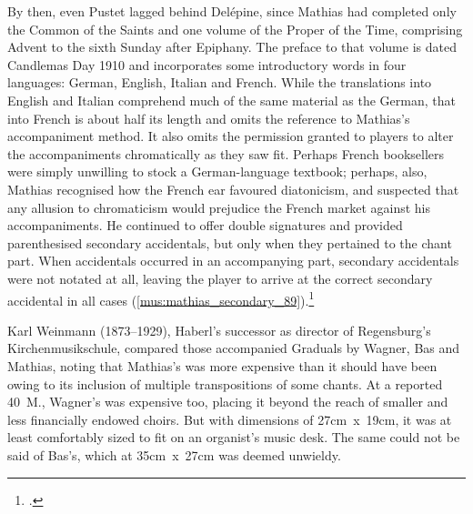 By then, even Pustet lagged behind Delépine, since Mathias had completed only the Common of the Saints and one volume of the Proper of the Time, comprising Advent to the sixth Sunday after Epiphany.
The preface to that volume is dated Candlemas Day 1910 and incorporates some introductory words in four languages: German, English, Italian and French.
While the translations into English and Italian comprehend much of the same material as the German, that into French is about half its length and omits the reference to Mathias's accompaniment method.
%
It also omits the permission granted to players to alter the accompaniments chromatically as they saw fit.
Perhaps French booksellers were simply unwilling to stock a German-language textbook; perhaps, also, Mathias recognised how the French ear favoured diatonicism, and suspected that any allusion to chromaticism would prejudice the French market against his accompaniments.
He continued to offer double signatures and provided parenthesised secondary accidentals, but only when they pertained to the chant part.
When accidentals occurred in an accompanying part, secondary accidentals were not notated at all, leaving the player to arrive at the correct secondary accidental in all cases (\cref{mus:mathias_secondary_89}).\footcite[unpaginated introductory remarks, pp.~50, 89]{MathiasOrganumcomitansad1936}

Karl Weinmann (1873--1929), Haberl's successor as director of Regensburg's \mbox{Kirchenmusikschule}, compared those accompanied Graduals by Wagner, Bas and Mathias, noting that Mathias's was more expensive than it should have been owing to its inclusion of multiple transpositions of some chants.
At a reported 40~M., Wagner's was expensive too, placing it beyond the reach of smaller and less financially endowed choirs.
But with dimensions of 27cm~x~19cm, it was at least comfortably sized to fit on an organist's music desk.
The same could not be said of Bas's, which at 35cm~x~27cm was deemed unwieldy.

